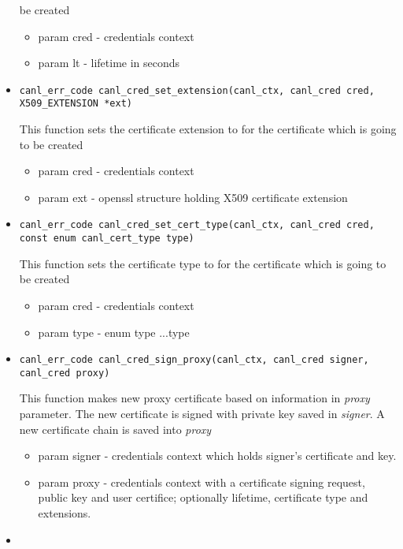 \begin{itemize}
  be created
  \begin{itemize}
    \item param cred - credentials context
    \item param lt - lifetime in seconds
  \end{itemize}
  \item \begin{verbatim}
canl_err_code canl_cred_set_extension(canl_ctx, canl_cred cred, X509_EXTENSION *ext)\end{verbatim}
  This function sets the certificate extension to for the certificate 
  which is going to be created
  \begin{itemize}
    \item param cred - credentials context 
    \item param ext - openssl structure holding X509 certificate extension
  \end{itemize}
\item \begin{verbatim}
canl_err_code canl_cred_set_cert_type(canl_ctx, canl_cred cred, const enum canl_cert_type type)\end{verbatim}
  This function sets the certificate type to for the certificate
  which is going to be created
  \begin{itemize}
    \item param cred - credentials context
    \item param type - \CANL enum type ...\TODO type
  \end{itemize}
  \item \begin{verbatim}
canl_err_code canl_cred_sign_proxy(canl_ctx, canl_cred signer, canl_cred proxy)\end{verbatim}
  This function makes new proxy certificate based on information in 
  \textit{proxy} parameter. The new certificate is signed with private key 
  saved in \textit{signer}. A new certificate chain is saved 
  into \textit{proxy}
  \begin{itemize}
    \item param signer - credentials context which holds signer's certificate
    and key.
    \item param proxy - credentials context with a certificate 
    signing request, public key and user certifice; optionally lifetime,
    certificate type and extensions.
  \end{itemize}
  \item \begin{verbatim}

\end{verbatim}
\end{itemize}
